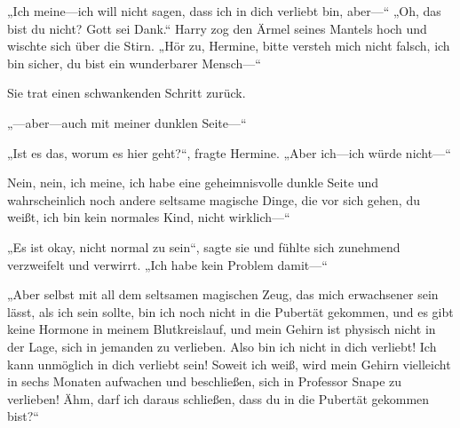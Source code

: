 „Ich meine—ich will nicht sagen, dass ich in dich verliebt bin, aber—“
„Oh, das bist du nicht? Gott sei Dank.“
Harry zog den Ärmel seines Mantels hoch und wischte sich über die Stirn.
„Hör zu, Hermine, bitte versteh mich nicht falsch, ich bin sicher, du bist ein wunderbarer Mensch—“

Sie trat einen schwankenden Schritt zurück.

„—aber—auch mit meiner dunklen Seite—“

„Ist es das, worum es hier geht?“, fragte Hermine. „Aber ich—ich würde nicht—“

Nein, nein, ich meine, ich habe eine geheimnisvolle dunkle Seite und wahrscheinlich noch andere seltsame magische Dinge, die vor sich gehen, du weißt, ich bin kein normales Kind, nicht wirklich—“

„Es ist okay, nicht normal zu sein“, sagte sie und fühlte sich zunehmend verzweifelt und verwirrt. „Ich habe kein Problem damit—“

„Aber selbst mit all dem seltsamen magischen Zeug, das mich erwachsener sein lässt, als ich sein sollte, bin ich noch nicht in die Pubertät gekommen, und es gibt keine Hormone in meinem Blutkreislauf, und mein Gehirn ist physisch nicht in der Lage, sich in jemanden zu verlieben. Also bin ich nicht in dich verliebt! Ich kann unmöglich in dich verliebt sein! Soweit ich weiß, wird mein Gehirn vielleicht in sechs Monaten aufwachen und beschließen, sich in Professor Snape zu verlieben! Ähm, darf ich daraus schließen, dass du in die Pubertät gekommen bist?“

